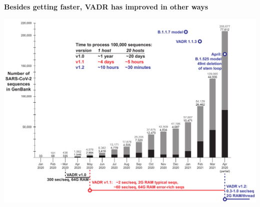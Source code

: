 \documentclass[landscape]{slides}
\begin{document}
\begin{slide}
\begin{center}
\textbf{Besides getting faster, VADR has improved in other ways}

\includegraphics[width=10.25in]{figs/sars-counts-jan2020-apr2021-slide6}

\end{center}

\vfill
\end{slide}
%
%
\end{document}
